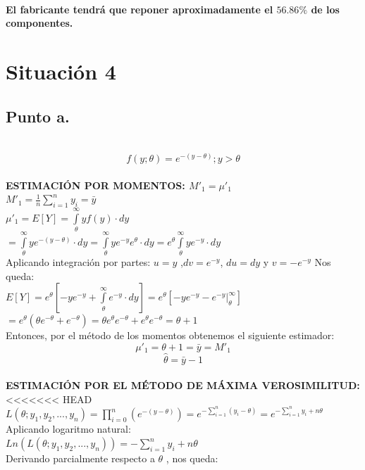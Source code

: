 \documentclass[letterpaper,12pt,onecolumn,titlepage]{article}
\begin{document}
~\\ \textbf{El fabricante tendr\'{a} que reponer aproximadamente el $56.86\%$ de los componentes.}
\pagebreak\section{Situaci\'{o}n 4}
\subsection{Punto a.}
~\\ $$f(y;\theta)=e^{-(y-\theta)};  y>\theta$$  
~\\ \textbf{ESTIMACI\'{O}N POR MOMENTOS: $M'_1=\mu'_1$}
~\\ $M'_1=\frac{1}{n}\sum_{i=1}^{n}{y_{i}}=\bar{y}$
~\\ $\mu'_1=E[Y]=\int \limits_{\theta}^{\infty} y f(y) \cdot dy$
~\\ $=\int \limits_{\theta}^{\infty} ye^{-(y-\theta)} \cdot dy=\int \limits_{\theta}^{\infty} ye^{-y}e^\theta \cdot dy=e^\theta\int \limits_{\theta}^{\infty}ye^{-y} \cdot dy$
~\\ Aplicando integraci\'{o}n por partes: $u=y$ ,$dv=e^{-y}$, $du=dy$ y $v=-e^{-y}$ Nos queda:
~\\ $E[Y]=e^{\theta}[-ye^{-y}+\int \limits_{\theta}^{\infty}e^{-y} \cdot dy] =e^{\theta}[-ye^{-y}- e^{-y}|_{\theta}^{\infty}] $
~\\ $=e^{\theta}(\theta e^{-\theta}+e^{-\theta})=\theta e^{\theta}e^{-\theta}+e^{\theta}e^{-\theta}= \theta + 1 $ 
~\\ Entonces, por el m\'{e}todo de los momentos obtenemos el siguiente estimador:
~\\ $$\mu'_1=\theta + 1= \bar{y} = M'_1$$
 $$\hat{\theta}=\bar{y}-1$$
~\\ \textbf{ESTIMACI\'{O}N POR EL M\'{E}TODO DE M\'{A}XIMA VEROSIMILITUD:}
<<<<<<< HEAD
~\\ $L(\theta; y_{1},y_{2},...,y_{n})=\prod \limits_{i=0}^{n}(e^{-(y-\theta)})=e^{-\sum \limits_{i=1}^n {(y_{i}-\theta)}}=e^{-\sum \limits_{i=1}^n y_{i} + n\theta}$
~\\ Aplicando logaritmo natural:
~\\ $Ln(L(\theta; y_{1},y_{2},...,y_{n}))=-\sum \limits_{i=1}^n y_{i} + n\theta$
~\\ Derivando parcialmente respecto a $\theta$ , nos queda:
\end{document}
